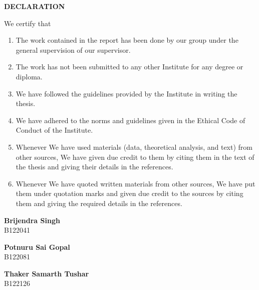 \documentclass[a4paper,12pt]{report}
\begin{document}
\clearpage

\vspace*{2cm}
\begin{center}
    \textbf{\Large DECLARATION}
\end{center}
\vspace{1cm}
We certify that
\begin{enumerate}
    \item The work contained in the report has been done by our group under the general supervision of our supervisor.
    \item The work has not been submitted to any other Institute for any degree or diploma.
    \item We have followed the guidelines provided by the Institute in writing the thesis.
    \item We have adhered to the norms and guidelines given in the Ethical Code of Conduct of the Institute.
    \item Whenever We have used materials (data, theoretical analysis, and text) from other sources, We have given due credit to them by citing them in the text of the thesis and giving their details in the references.
    \item Whenever We have quoted written materials from other sources, We have put them under quotation marks and given due credit to the sources by citing them and giving the required details in the references.
\end{enumerate}
\vspace{3cm}
\begin{flushright}
    \textbf{Brijendra Singh} \\ {B122041}
\end{flushright}
\begin{flushright}
    \textbf{Potnuru Sai Gopal} \\ {B122081}
\end{flushright}
\begin{flushright}
    \textbf{Thaker Samarth Tushar} \\ {B122126}
\end{flushright}

\clearpage
\end{document}
